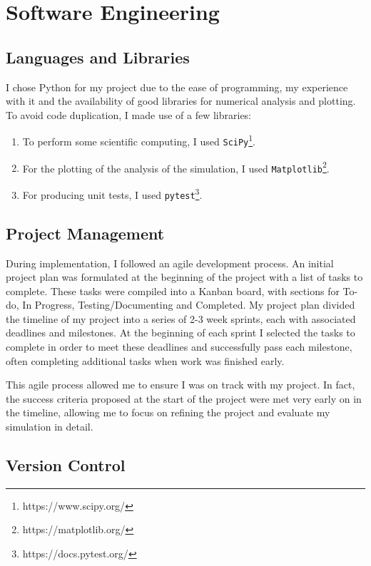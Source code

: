 \documentclass[12pt,a4paper]{report}
\begin{document}
\section{Software Engineering}\label{section:software}

\subsection{Languages and Libraries}

I chose Python for my project due to the ease of programming, my experience with it and the availability of good libraries for numerical analysis and plotting. To avoid code duplication, I made use of a few libraries:

\begin{enumerate}
 	\item To perform some scientific computing, I used \verb|SciPy|\footnote{https://www.scipy.org/}.
	\item For the plotting of the analysis of the simulation, I used \verb|Matplotlib|\footnote{https://matplotlib.org/}. 
	\item For producing unit tests, I used \verb|pytest|\footnote{https://docs.pytest.org/}.
\end{enumerate}

\subsection{Project Management}

During implementation, I followed an agile development process. An initial project plan was formulated at the beginning of the project with a list of tasks to complete. These tasks were compiled into a Kanban board, with sections for To-do, In Progress, Testing/Documenting and Completed. My project plan divided the timeline of my project into a series of 2-3 week sprints, each with associated deadlines and milestones. At the beginning of each sprint I selected the tasks to complete in order to meet these deadlines and successfully pass each milestone, often completing additional tasks when work was finished early.

This agile process allowed me to ensure I was on track with my project. In fact, the success criteria proposed at the start of the project were met very early on in the timeline, allowing me to focus on refining the project and evaluate my simulation in detail.%

\subsection{Version Control}
\end{document}
